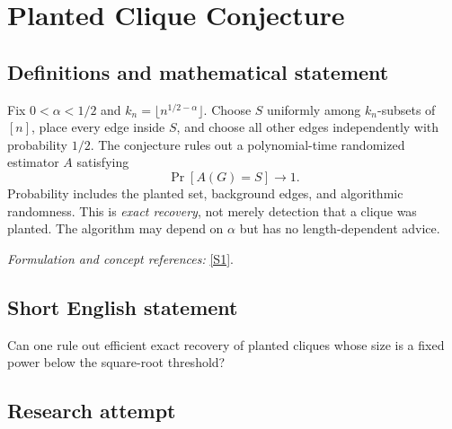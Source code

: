 \documentclass[11pt,a4paper]{article}
\newcommand{\sref}[2]{\hyperlink{source:#1:#2}{[S#2]}}
\newif\ifshowcatalogue
\newcommand{\cataloguescope}[1]{\ifshowcatalogue
 \paragraph{Exact scope in the supplied catalogue.}
 \begin{quote}\small #1\end{quote}\fi}
\numberwithin{equation}{section}
\begin{document}
\setcounter{section}{0}
\clearpage
\section*{\texorpdfstring{Planted Clique Conjecture}{Planted Clique Conjecture}}\label{statement}
\subsection{Definitions and mathematical statement}
Fix $0<\alpha<1/2$ and $k_n=\lfloor n^{1/2-\alpha}\rfloor$. Choose $S$ uniformly among $k_n$-subsets of $[n]$, place every edge inside $S$, and choose all other edges independently with probability $1/2$. The conjecture rules out a polynomial-time randomized estimator $A$ satisfying
\[
 \Pr[A(G)=S]\longrightarrow1.
\]
Probability includes the planted set, background edges, and algorithmic randomness. This is \emph{exact recovery}, not merely detection that a clique was planted. The algorithm may depend on $\alpha$ but has no length-dependent advice.
\par\smallskip\textit{Formulation and concept references:} \sref{statement}{1}.
\cataloguescope{For every fixed real alpha with 0<alpha<1/2, set k\_n=floor(n\textasciicircum{}(1/2-alpha)). Sample a uniform k\_n-subset S of n labeled vertices, put every edge inside S, and independently include each other edge with probability1/2. There is no randomized algorithm running in time polynomial in n that, given this graph, outputs exactly S with probability tending to1 as n tends to infinity, over S, remaining edges and its internal coins. Algorithms may depend on the fixed alpha but receive no advice depending on n.}
\subsection{Short English statement}
Can one rule out efficient exact recovery of planted cliques whose size is a fixed power below the square-root threshold?
\subsection{Research attempt}
\end{document}
